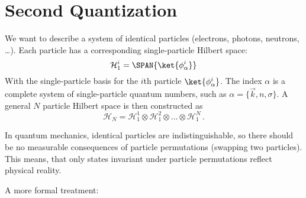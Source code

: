 \documentclass[../classnotes.tex]{subfiles}
\begin{document}
\chapter{Second Quantization}

We want to describe a system of identical particles (electrons, photons, neutrons, \ldots).
Each particle has a corresponding single-particle Hilbert space:
\begin{equation}
    \mathcal{H}_1^i = \SPAN\{\ket{\phi_{\alpha}^i}\}   
\end{equation}
With the single-particle basis for the \(i\)th particle \(\ket{\phi_{\alpha}^i}\).
The index \(\alpha\) is a complete system of single-particle quantum numbers, such as \(\alpha = \{\vec{k}, n, \sigma\}\).
A general \(N\) particle Hilbert space is then constructed as
\begin{equation}
    \mathcal{H}_N = \mathcal{H}_1^1 \otimes \mathcal{H}_1^2 \otimes \ldots \otimes \mathcal{H}_1^N\,.
\end{equation}

In quantum mechanics, identical particles are indistinguishable, so there should be no measurable consequences of particle permutations (swapping two particles).
This means, that only states invariant under particle permutations reflect physical reality.

A more formal treatment:
\end{document}
